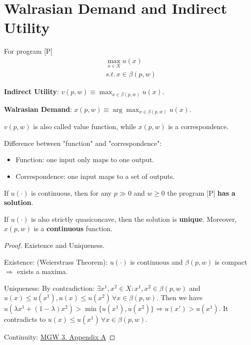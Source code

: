\section{Walrasian Demand and Indirect Utility}

\begin{definition}
    For program [P] \begin{align*}
         & \max_{x \in X} u(x)      \\
         & s.t. \, x \in \beta(p,w)
    \end{align*}

    \textbf{Indirect Utility}: $v(p,w) \equiv \max_{x \in \beta(p,w)} u(x)$.

    \textbf{Walrasian Demand}: $x(p,w) \equiv \arg\max_{x \in \beta(p,w)} u(x)$.

\end{definition}

\begin{remark*}
    $v(p,w)$ is also called value function, while $x(p,w)$ is a correspondence.

    Difference between "function" and "correspondence": \begin{itemize}
        \item Function: one input only maps to one output.
        \item Correspondence: one input maps to a set of outputs.
    \end{itemize}
\end{remark*}

\begin{proposition}
    If $u(\cdot )$ is continuous, then for any $p \gg 0$ and $w \geq 0$ the program [P] \textbf{has a solution}.

    If $u(\cdot )$ is also strictly quasiconcave, then the solution is \textbf{unique}. Moreover, $x(p,w)$ is a \textbf{continuous} function.
\end{proposition}

\begin{proof} Existence and Uniqueness.

    Existence: (Weierstrass Theorem): $u(\cdot )$ is continuous and $\beta(p,w)$ is compact $\Longrightarrow$ exists a maxima.

    Uniqueness: By contradiction: $\exists x^1, x^2 \in X: x^1, x^2 \in \beta(p,w) $ and $u(x) \leq u(x^1), u(x)\leq u(x^2)\, \forall x \in \beta(p,w)$. Then we have $u(\lambda x^1 + (1-\lambda)x^2) > \min\{u(x^1), u(x^2)\} \Longrightarrow u(x') > u(x^1)$. It contradicts to $u(x) \leq u(x^1)\, \forall x \in \beta(p,w)$.

    Continuity: \underline{MGW 3. Appendix A}
\end{proof}

